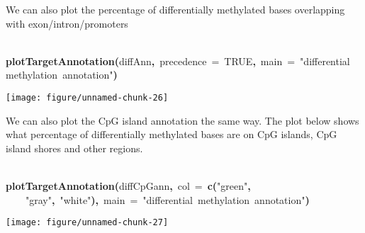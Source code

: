 \documentclass{article}
\makeatletter
\newcommand{\hlnumber}[1]{\textcolor[rgb]{0,0,0}{#1}}%
\newcommand{\hlfunctioncall}[1]{\textcolor[rgb]{.5,0,.33}{\textbf{#1}}}%
\newcommand{\hlstring}[1]{\textcolor[rgb]{.6,.6,1}{#1}}%
\newcommand{\hlkeyword}[1]{\textbf{#1}}%
\newcommand{\hlargument}[1]{\textcolor[rgb]{.69,.25,.02}{#1}}%
\newcommand{\hlsymbol}[1]{#1}%
\newcommand{\hlstd}[1]{\textcolor[rgb]{0,0,0}{#1}}%
\newenvironment{kframe}{%
 \def\FrameCommand##1{\hskip\@totalleftmargin \hskip-\fboxsep
 \colorbox{shadecolor}{##1}\hskip-\fboxsep
     \hskip-\linewidth \hskip-\@totalleftmargin \hskip\columnwidth}%
 \MakeFramed {\advance\hsize-\width
   \@totalleftmargin\z@ \linewidth\hsize
   \@setminipage}}%
 {\par\unskip\endMakeFramed}
\newenvironment{knitrout}{}{} %
\makeatother
\begin{document}
We can also plot the percentage of differentially methylated bases overlapping with exon/intron/promoters

\begin{center}
\begin{knitrout}
\color{fgcolor}\begin{kframe}
\begin{flushleft}
\ttfamily\noindent
\hspace*{\fill}\\
\hlstd{}\hlfunctioncall{plotTargetAnnotation}\hlkeyword{(}\hlsymbol{diffAnn}\hlkeyword{,}{\ }\hlargument{precedence}{\ }\hlargument{=}{\ }\hlnumber{TRUE}\hlkeyword{,}{\ }\hlargument{main}{\ }\hlargument{=}{\ }\hlstring{"{}differential{\ }methylation{\ }annotation"{}}\hlkeyword{)}\mbox{}
\normalfont
\end{flushleft}
\end{kframe}

{\centering \texttt{[image: figure/unnamed-chunk-26]} 

}


\end{knitrout}

\end{center}

We can also plot the CpG island annotation the same way. The plot below shows what percentage of differentially methylated bases are on CpG islands, CpG island shores and other regions.

\begin{center}
\begin{knitrout}
\color{fgcolor}\begin{kframe}
\begin{flushleft}
\ttfamily\noindent
\hspace*{\fill}\\
\hlstd{}\hlfunctioncall{plotTargetAnnotation}\hlkeyword{(}\hlsymbol{diffCpGann}\hlkeyword{,}{\ }\hlargument{col}{\ }\hlargument{=}{\ }\hlfunctioncall{c}\hlkeyword{(}\hlstring{"{}green"{}}\hlkeyword{,}\hspace*{\fill}\\
\hlstd{}{\ }{\ }{\ }{\ }\hlstring{"{}gray"{}}\hlkeyword{,}{\ }\hlstring{"{}white"{}}\hlkeyword{)}\hlkeyword{,}{\ }\hlargument{main}{\ }\hlargument{=}{\ }\hlstring{"{}differential{\ }methylation{\ }annotation"{}}\hlkeyword{)}\mbox{}
\normalfont
\end{flushleft}
\end{kframe}

{\centering \texttt{[image: figure/unnamed-chunk-27]} 

}


\end{knitrout}

\end{center}
\end{document}

